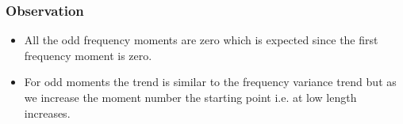 \documentclass{article}
\begin{document}
\begin{figure}[H]
    \centering
    \qquad
    \label{fig:example}%
\end{figure}

\begin{figure}[H]
    \centering
    \qquad
    \label{fig:example}%
\end{figure}

\subsubsection{Observation}
\begin{itemize}
\item All the odd frequency moments are zero which is expected since the first frequency moment is zero.
\item For odd moments the trend is similar to the frequency variance trend but as we increase the moment number the starting point i.e. at low length increases.
\end{itemize}
\end{document}
